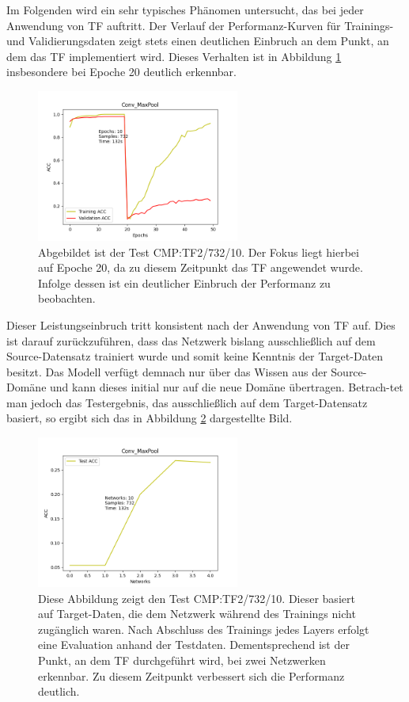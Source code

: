 Im Folgenden wird ein sehr typisches Phänomen untersucht, das bei jeder Anwendung von TF auftritt. Der Verlauf der 
Performanz-Kurven für Trainings- und Validierungsdaten zeigt stets einen deutlichen Einbruch an dem Punkt, an dem das TF 
implementiert wird. Dieses Verhalten ist in Abbildung \ref{fig:convmaxpooltrain} insbesondere bei Epoche 20 deutlich erkennbar.

\begin{figure}[htpb]
    \centering
    \includegraphics[height=5cm]{../../Plots/ba_plots/convmaxpool/convmaxpooltrain.png}
    \caption{\label{fig:convmaxpooltrain} 
    \small{Abgebildet ist der Test CMP:TF2/732/10. Der Fokus liegt hierbei auf Epoche 20, da zu diesem Zeitpunkt das TF 
    angewendet wurde. Infolge dessen ist ein deutlicher Einbruch der Performanz zu beobachten.}}
\end{figure}

Dieser Leistungseinbruch tritt konsistent nach der Anwendung von TF auf. Dies ist darauf zurückzuführen, dass das Netzwerk 
bislang ausschließlich auf dem Source-Datensatz trainiert wurde und somit keine Kenntnis der Target-Daten besitzt. Das Modell verfügt demnach 
nur über das Wissen aus der Source-Domäne und kann dieses initial nur auf die neue Domäne übertragen. Betrach-tet man jedoch das Testergebnis, 
das ausschließlich auf dem Target-Datensatz basiert, so ergibt sich das in Abbildung \ref{fig:convmaxpooltest} dargestellte Bild.

\begin{figure}[htpb]
    \centering
    \includegraphics[height=5cm]{../../Plots/ba_plots/convmaxpool/convmaxpooltest.png}
    \caption{\label{fig:convmaxpooltest} 
    \small{Diese Abbildung zeigt den Test CMP:TF2/732/10. Dieser basiert auf Target-Daten, die dem Netzwerk während des 
    Trainings nicht zugänglich waren. Nach Abschluss des Trainings jedes Layers erfolgt eine Evaluation anhand der Testdaten. Dementsprechend 
    ist der Punkt, an dem TF durchgeführt wird, bei zwei Netzwerken erkennbar. Zu diesem Zeitpunkt verbessert sich die 
    Performanz deutlich.}}
\end{figure}

